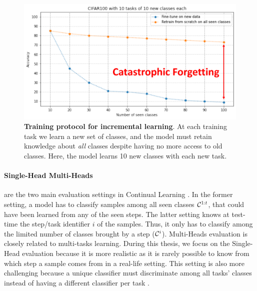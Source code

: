 \begin{figure}[tb]
      \begin{center}
            \includegraphics[width=0.8\linewidth]{images/related/catastrophic_forgetting.pdf}
      \end{center}
      \caption{\textbf{Training protocol for incremental learning}. At each training task we learn a
            new set of classes, and the model must retain knowledge about \textit{all} classes
            despite having no more access to old classes. Here, the model learns 10 new classes with
            each new task.}
      \label{fig:related_forgetting}
\end{figure}

\paragraph{Single-Head \vs Multi-Heads} are the two main evaluation settings in Continual Learning
\citep{chaudhry2018riemannien_walk}. In the former setting, a model has to classify samples among
all seen classes $\mathcal{C}^{1:t}$, that could have been learned from any of the seen steps. The latter
setting knows at test-time the step/task identifier $i$ of the samples. Thus, it only has to
classify among the limited number of classes brought by a step ($\mathcal{C}^i$). Multi-Heads evaluation is
closely related to multi-tasks learning. During this thesis, we focus on the Single-Head evaluation
because it is more realistic as it is rarely possible to know from which step a sample comes
from in a real-life setting. This setting is also more challenging because a unique classifier must
discriminate among all tasks' classes instead of having a different classifier per task
\citep{lesort2019regulshortcomings}.


\label{sec:related_metrics}

